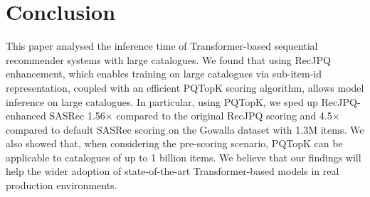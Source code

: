 \documentclass[sigconf,natbib=true, review=False]{acmart} %
\newcommand{\rsasha}[1]{\textcolor[HTML]{000000}{#1}}
\newcommand{\gsasha}[1]{\textcolor[HTML]{000000}{#1}}
\begin{document}
\section{Conclusion}\label{sec:conclusion}
 This paper analysed the inference time of Transformer-based sequential recommender systems with large catalogues. \gsasha{We found that using RecJPQ enhancement, which enables training on large catalogues via sub-item-id representation, coupled with an efficient PQTopK scoring algorithm,} allows model inference on large catalogues. In particular, \gsasha{using PQTopK, we sped up RecJPQ-enhanced SASRec 1.56$\times$ compared to the original RecJPQ scoring and 4.5$\times$ compared to default SASRec scoring} \rsasha{on the Gowalla dataset with 1.3M items}. We also showed that, when considering the pre-scoring scenario, PQTopK can be applicable to catalogues of up to 1 billion items. We believe that our findings will help the wider adoption of state-of-the-art Transformer-based models in real production environments. 


\balance

\clearpage
\end{document}

